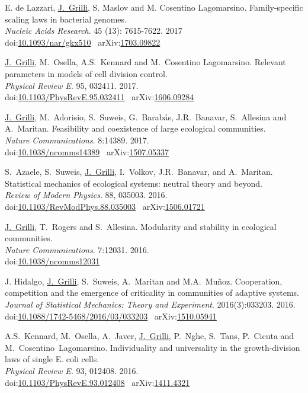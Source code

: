 \documentclass[10pt]{article}
\newcommand\JG{\underline{J.~Grilli}}
\newcommand\doilink[1]{\href{http://dx.doi.org/#1}{#1}}
\newcommand\doi[1]{doi:\doilink{#1}}
\newcommand\arxivlink[1]{\href{http://arxiv.org/abs/#1}{#1}}
\newcommand\arxiv[1]{arXiv:\arxivlink{#1}}
\begin{document}
\begin{bibenum}
    \item E. de Lazzari, \JG, S. Maslov and M. Cosentino Lagomarsino.
	Family-specific scaling laws in bacterial genomes. \\
	\emph{Nucleic Acids Research}. 45 (13): 7615-7622. 2017\\
    \doi{10.1093/nar/gkx510} \
	\arxiv{1703.09822}	

    \item \JG, M.~Osella, A.S.~Kennard and M.~Cosentino Lagomarsino.
	Relevant parameters in models of cell division control. \\
    \emph{Physical Review E}.  95, 032411. 2017.
    \\
    \doi{10.1103/PhysRevE.95.032411} \
	\arxiv{1606.09284}	

    \item \JG, M.~Adorisio, S.~Suweis, G.~Barab\'as, J.R.~Banavar, S.~Allesina and A.~Maritan.
	Feasibility and coexistence of large ecological communities. \\
    \emph{Nature Communications}. 8:14389. 2017.
    \\
    \doi{10.1038/ncomms14389} \
	\arxiv{1507.05337}	

    \item S.~Azaele, S.~Suweis, \JG, I.~Volkov, J.R.~Banavar, and A.~Maritan.
	Statistical mechanics of ecological systems: neutral theory and beyond. \\
    \emph{Review of Modern Physics}. 88, 035003. 2016.
    \\
    \doi{10.1103/RevModPhys.88.035003} \
	\arxiv{1506.01721}

    \item \JG, T.~Rogers and S.~Allesina.
	Modularity and stability in ecological communities. \\
    \emph{Nature Communications}. 7:12031. 2016. \\ 
    \doi{10.1038/ncomms12031} \

    \item J. Hidalgo, \JG,  S.~Suweis, A.~Maritan and M.A.~Mu\~noz.
	Cooperation, competition and the emergence of criticality in communities of adaptive systems. \\
	\emph{Journal of Statistical Mechanics: Theory and Experiment}. 2016(3):033203. 2016. \\
    \doi{10.1088/1742-5468/2016/03/033203} \
	\arxiv{1510.05941}	


    \item A.S.~Kennard, M.~Osella, A.~Javer, \JG, P.~Nghe, S.~Tans, P.~Cicuta and M.~Cosentino~Lagomarsino.
	Individuality and universality in the growth-division laws of single E. coli cells. \\
    \emph{Physical Review E}.  93, 012408. 2016.
    \\
    \doi{10.1103/PhysRevE.93.012408} \
	\arxiv{1411.4321}	


\end{bibenum}
\end{document}
